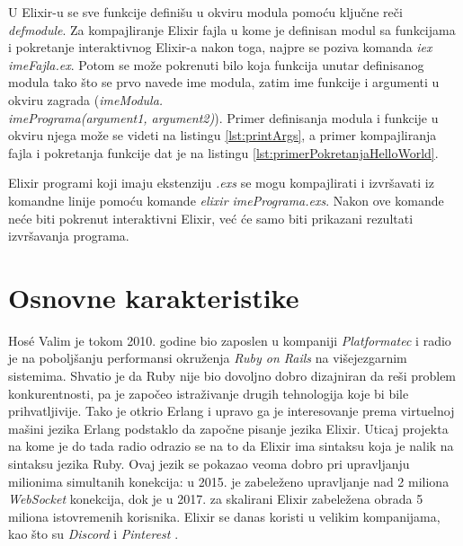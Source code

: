 \documentclass[12pt,oneside]{memoir}
\begin{document}


\noindent U Elixir-u se sve funkcije definišu u okviru modula pomoću ključne reči \textit{defmodule}. Za kompajliranje Elixir fajla u kome je definisan modul sa funkcijama i pokretanje interaktivnog Elixir-a nakon toga, najpre se poziva komanda \textit{iex imeFajla.ex}. Potom se može pokrenuti bilo koja funkcija unutar definisanog modula tako što se prvo navede ime modula, zatim ime funkcije i argumenti u okviru zagrada (\textit{imeModula.\\imePrograma(argument1, argument2)}). Primer definisanja modula i funkcije u okviru njega može se videti na listingu \ref{lst:printArgs}, a primer kompajliranja fajla i pokretanja funkcije dat je na listingu \ref{lst:primerPokretanjaHelloWorld}.





Elixir programi koji imaju ekstenziju \textit{.exs} se mogu kompajlirati i izvršavati iz komandne linije pomoću komande \textit{elixir imePrograma.exs}. Nakon ove komande neće biti pokrenut interaktivni Elixir, već će samo biti prikazani rezultati izvršavanja programa.

\section{Osnovne karakteristike}

Hosé Valim je tokom 2010. godine bio zaposlen u kompaniji \textit{Platformatec} \cite{Platformatec} i radio je na poboljšanju performansi okruženja
\textit{Ruby on Rails} na višejezgarnim sistemima. Shvatio je da Ruby nije bio dovoljno dobro dizajniran da reši problem konkurentnosti, pa je započeo istraživanje drugih tehnologija koje bi bile prihvatljivije. Tako je otkrio Erlang i upravo ga je interesovanje prema virtuelnoj mašini jezika Erlang podstaklo da započne pisanje jezika Elixir. Uticaj projekta na kome je do tada radio odrazio se na to da Elixir ima sintaksu koja je nalik na sintaksu jezika Ruby. Ovaj jezik se pokazao veoma dobro pri upravljanju
milionima simultanih konekcija: u 2015. je zabeleženo upravljanje nad 2 miliona \textit{WebSocket} konekcija, dok je u 2017. za skalirani Elixir zabeležena obrada 5 miliona istovremenih korisnika. Elixir se danas koristi u velikim kompanijama, kao što su \textit{Discord}  i \textit{Pinterest} \cite{HistoryOfElixir}.
\end{document}
